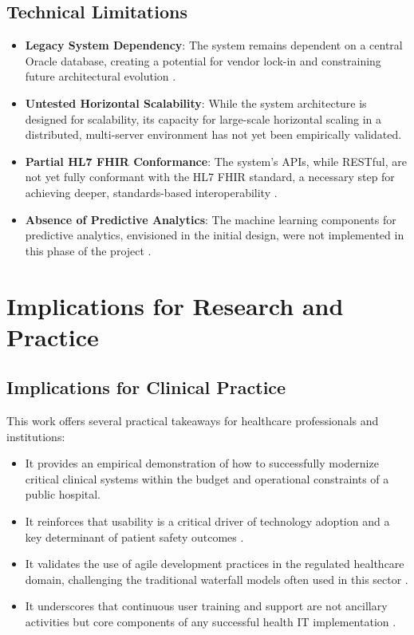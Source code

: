 \subsection{Technical Limitations}

\begin{itemize}
    \item \textbf{Legacy System Dependency}: The system remains dependent on a central Oracle database, creating a potential for vendor lock-in and constraining future architectural evolution \cite{lin2018}.
    \item \textbf{Untested Horizontal Scalability}: While the system architecture is designed for scalability, its capacity for large-scale horizontal scaling in a distributed, multi-server environment has not yet been empirically validated.
    \item \textbf{Partial HL7 FHIR Conformance}: The system's APIs, while RESTful, are not yet fully conformant with the HL7 FHIR standard, a necessary step for achieving deeper, standards-based interoperability \cite{mandl2020}.
    \item \textbf{Absence of Predictive Analytics}: The machine learning components for predictive analytics, envisioned in the initial design, were not implemented in this phase of the project \cite{bates2021}.
\end{itemize}

\section{Implications for Research and Practice}

\subsection{Implications for Clinical Practice}
This work offers several practical takeaways for healthcare professionals and institutions:
\begin{itemize}
    \item It provides an empirical demonstration of how to successfully modernize critical clinical systems within the budget and operational constraints of a public hospital.
    \item It reinforces that usability is a critical driver of technology adoption and a key determinant of patient safety outcomes \cite{mcgreevey2020}.
    \item It validates the use of agile development practices in the regulated healthcare domain, challenging the traditional waterfall models often used in this sector \cite{vaghasiya2021}.
    \item It underscores that continuous user training and support are not ancillary activities but core components of any successful health IT implementation \cite{kvarnstrom2023}.
\end{itemize}


